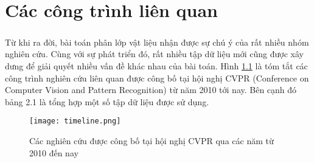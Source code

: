 \chapter{Các công trình liên quan}
\ifpdf
    \graphicspath{{Chapter2/Chapter2Figs/PNG/}{Chapter2/Chapter2Figs/PDF/}{Chapter2/Chapter2Figs/}}
\else
    \graphicspath{{Chapter2/Chapter2Figs/EPS/}{Chapter2/Chapter2Figs/}}
\fi

\paragraph*{}
Từ khi ra đời, bài toán phân lớp vật liệu nhận được sự chú ý của rất nhiều nhóm nghiên cứu. Cùng với sự phát triển đó, rất nhiều tập dữ liệu mới cũng được xây dưng để giải quyết nhiều vấn đề khác nhau của bài toán. Hình \ref{fig:timeline} là tóm tắt các công trình nghiên cứu liên quan được công bố tại hội nghị CVPR (Conference on Computer Vision and Pattern Recognition) từ năm 2010 tới nay. Bên cạnh đó bảng 2.1 là tổng hợp một số tập dữ liệu được sử dụng.

\begin{figure}[h!]
	\centering
	\captionsetup{width=0.9\textwidth}
	\texttt{[image: timeline.png]}
	\caption{Các nghiên cứu được công bố tại hội nghị CVPR qua các năm từ 2010 đến nay}
    \label{fig:timeline}
\end{figure}

\begin{table}
\label{tab:datasets}
\begin{center}
\captionsetup{width=0.9\textwidth}
\caption{Một số tập dữ liệu được dùng cho phân lớp dữ liệu \cite{xue2017differential}}
\end{center}
\end{table}

